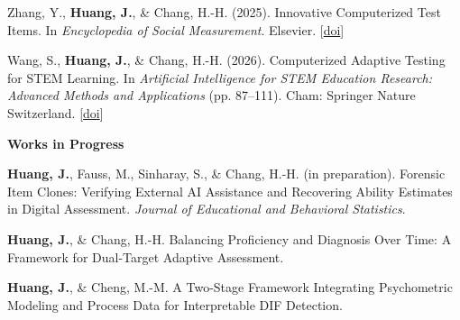\documentclass[10.5pt,letterpaper]{article}
\newcommand{\me}[1]{\textbf{#1}}   %
\newcommand{\doi}[1]{[\href{https://doi.org/#1}{\textcolor{linkblue}{doi}}]}   %
\begin{document}
\begin{pubs}
\item Zhang, Y., \me{Huang, J.}, \& Chang, H.-H. (2025). Innovative Computerized Test Items. In \textit{Encyclopedia of Social Measurement}. Elsevier. \doi{10.1016/B978-0-443-26629-4.00043-5}
\item Wang, S., \me{Huang, J.}, \& Chang, H.-H. (2026). Computerized Adaptive Testing for STEM Learning. In \textit{Artificial Intelligence for STEM Education Research: Advanced Methods and Applications} (pp. 87--111). Cham: Springer Nature Switzerland. \doi{10.1007/978-3-032-06565-0_5}
\end{pubs}
\vspace{4pt}
{\color{textdark}\textbf{Works in Progress}}\par\vspace{2pt}
\begin{pubs}
\item \me{Huang, J.}, Fauss, M., Sinharay, S., \& Chang, H.-H. (in preparation). Forensic Item Clones: Verifying External AI Assistance and Recovering Ability Estimates in Digital Assessment. \textit{Journal of Educational and Behavioral Statistics}.
\item \me{Huang, J.}, \& Chang, H.-H. Balancing Proficiency and Diagnosis Over Time: A Framework for Dual-Target Adaptive Assessment.
\item \me{Huang, J.}, \& Cheng, M.-M. A Two-Stage Framework Integrating Psychometric Modeling and Process Data for Interpretable DIF Detection.
\end{pubs}

\end{document}
